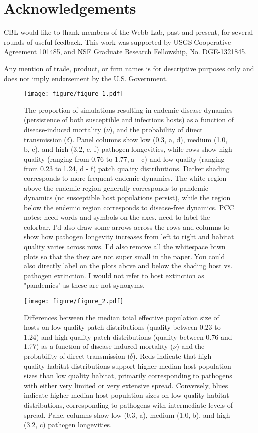 \documentclass{article}
\begin{document}
\section{Acknowledgements}

CBL would like to thank members of the Webb Lab, past and present, for several rounds of useful feedback.  This work was supported by USGS Cooperative Agreement 101485, and NSF Graduate Research Fellowship, No. DGE-1321845.

Any mention of trade, product, or firm names is for descriptive purposes only and does not imply endorsement by the U.S. Government.

\clearpage

     

\clearpage

\begin{figure}
\texttt{[image: figure/figure\_1.pdf]}
\caption{The proportion of simulations resulting in endemic disease dynamics (persistence of both susceptible and infectious hosts) as a function of disease-induced mortality ($\nu$), and the probability of direct transmission ($\delta$).  Panel columns show low (0.3, a, d), medium (1.0, b, e), and high (3.2, c, f) pathogen longevities, while rows show high quality (ranging from 0.76 to 1.77, a - c) and low quality (ranging from 0.23 to 1.24, d - f) patch quality distributions.  Darker shading corresponds to more frequent endemic dynamics.  The white region above the endemic region generally corresponds to pandemic dynamics (no susceptible host populations persist), while the region below the endemic region corresponds to disease-free dynamics. PCC notes: need words and symbols on the axes. need to label the colorbar. I'd also draw some arrows across the rows and columns to show how pathogen longevity increases from left to right and habitat quality varies across rows. I'd also remove all the whitespace btwn plots so that the they are not super small in the paper. You could also directly label on the plots above and below the shading host vs. pathogen extinction.  I would not refer to host extinction as "pandemics" as these are not synonyms.}
\label{endemic}
\end{figure}

\begin{figure}
\texttt{[image: figure/figure\_2.pdf]}
\centering
\caption{Differences between the median total effective population size of hosts on low quality patch distributions (quality between 0.23 to 1.24) and high quality patch distributions (quality between 0.76 and 1.77) as a function of disease-induced mortality ($\nu$) and the probability of direct transmission ($\delta$).  Reds indicate that high quality habitat distributions support higher median host population sizes than low quality habitat, primarily corresponding to pathogens with either very limited or very extensive spread. Conversely, blues indicate higher median host population sizes on low quality habitat distributions, corresponding to pathogens with intermediate levels of spread.  Panel columns show low (0.3, a), medium (1.0, b), and high (3.2, c) pathogen longevities.}
\label{highvlow}
\end{figure}
\end{document}
